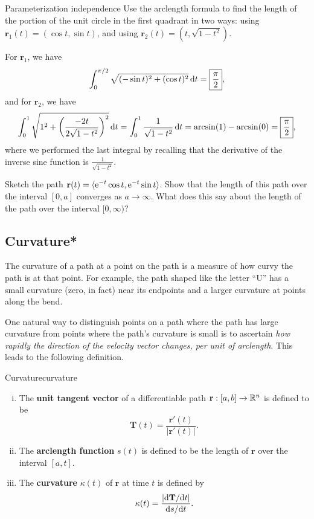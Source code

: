 \documentclass[prettycode,shellescape]{watsonbook}
\begin{document}
\begin{example}{Parameterization independence}{}
  Use the arclength formula to find the length of the portion of the
  unit circle in the first quadrant in two ways: using $\mathbf{r}_1(t)
  = (\cos t, \sin t)$, and using $\mathbf{r}_2(t) = (t,\sqrt{1-t^2})$. 
\end{example}

\begin{solution}
  For $\mathbf{r}_1$, we have 
  \[
    \int_0^{\pi/2} \sqrt{(-\sin t)^2 + (\cos t)^2} \, \mathrm{d} t = \boxed{\frac{\pi}{2}}, 
  \]
  and for $\mathbf{r}_2$, we have
  \[
    \int_0^1 \sqrt{1^2 + \left(\frac{-2t}{2\sqrt{1-t^2}}\right)^2}\, \mathrm{d}
    t =  \int_0^1 \frac{1}{\sqrt{1-t^2}} \, \mathrm{d} t = \arcsin(1) -
    \arcsin(0) = \boxed{\frac{\pi}{2}}, 
  \]
  where we performed the last integral by recalling that the
  derivative of the inverse sine function is
  $\frac{1}{\sqrt{1-t^2}}$. 
\end{solution}

\begin{exercise}{}{}
  Sketch the path
  $\mathbf{r}(t) = \langle \mathrm{e}^{-t} \cos t, \mathrm{e}^{-t} \sin t \rangle$. Show
  that the length of this path over the interval $[0,a]$ converges as
  $a\to\infty$. What does this say about the length of the path over
  the interval $[0,\infty)$?
\end{exercise}

\subsection{Curvature*} 

The curvature of a path at a point on the path is a measure of how
curvy the path is at that point. For example, the path shaped like the
letter ``\textsf{U}'' has a small curvature (zero, in fact) near its
endpoints and a larger curvature at points along the bend.

One natural way to distinguish points on a path where the path has
large curvature from points where the path's curvature is small is to
ascertain \textit{how rapidly the direction of the velocity vector
  changes, per unit of arclength}. This leads to the following
definition.

\begin{defn}[breakable]{Curvature}{curvature}
  \begin{enumerate}[(i),leftmargin=12pt,topsep=-6pt,itemsep=4pt]
  \item The \textbf{unit tangent vector} of a differentiable path $\mathbf{r}:[a,b]
    \to \mathbb{R}^n$ is defined to be
    \[
      \mathbf{T}(t) = \frac{\mathbf{r}'(t)}{|\mathbf{r}'(t)|}. 
    \]
  \item The \textbf{arclength function} $s(t)$ is defined to be the length
    of $\mathbf{r}$ over the interval $[a,t]$.
  \item The \textbf{curvature} $\kappa(t)$ of $\mathbf{r}$ at time $t$ is
    defined by
    \[
      \mathbf{\kappa}(t) = \frac{|\mathrm{d}\mathbf{T}/\mathrm{d} t|}{\mathrm{d} s/\mathrm{d} t}. 
    \]
  \end{enumerate}
\end{defn}
\end{document}
